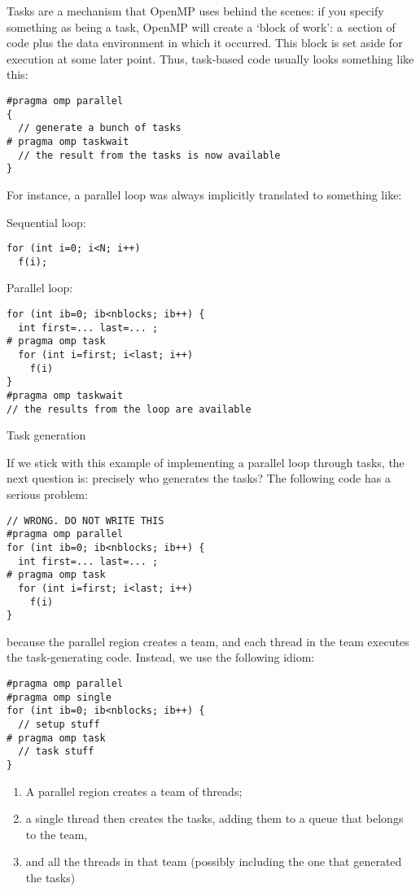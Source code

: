 
\label{sec:omp:task}

Tasks are a mechanism that OpenMP uses behind the scenes:
if you specify something as being a task, OpenMP will create
a `block of work': a~section of code plus the data environment
in which it occurred. This block is set aside for execution at some later point.
Thus, task-based code usually looks something like this:
\begin{lstlisting}
#pragma omp parallel
{
  // generate a bunch of tasks
# pragma omp taskwait
  // the result from the tasks is now available  
}
\end{lstlisting}
For instance, a parallel loop was always implicitly translated to something like:
\begin{multicols}{2}
Sequential loop:
\begin{lstlisting}
for (int i=0; i<N; i++)
  f(i);
\end{lstlisting}
\columnbreak
Parallel loop:
\begin{lstlisting}
for (int ib=0; ib<nblocks; ib++) {
  int first=... last=... ;
# pragma omp task
  for (int i=first; i<last; i++)
    f(i)
}
#pragma omp taskwait
// the results from the loop are available
\end{lstlisting}
\end{multicols}

 {Task generation}

If we stick with this example of implementing a parallel loop
through tasks, the next question is: precisely who generates the tasks?
The following code has a serious problem:
\begin{lstlisting}
// WRONG. DO NOT WRITE THIS
#pragma omp parallel
for (int ib=0; ib<nblocks; ib++) {
  int first=... last=... ;
# pragma omp task
  for (int i=first; i<last; i++)
    f(i)
}
\end{lstlisting}
because the parallel region creates a team, and each thread in the team
executes the task-generating code.
Instead, we use the following idiom:
\begin{lstlisting}
#pragma omp parallel
#pragma omp single
for (int ib=0; ib<nblocks; ib++) {
  // setup stuff
# pragma omp task
  // task stuff
}
\end{lstlisting}
\begin{enumerate}
\item A parallel region creates a team of threads;
\item a single thread then creates the tasks, adding them to a queue
  that belongs to the team,
\item and all the threads in that team (possibly including the one
  that generated the tasks) 
\end{enumerate}

